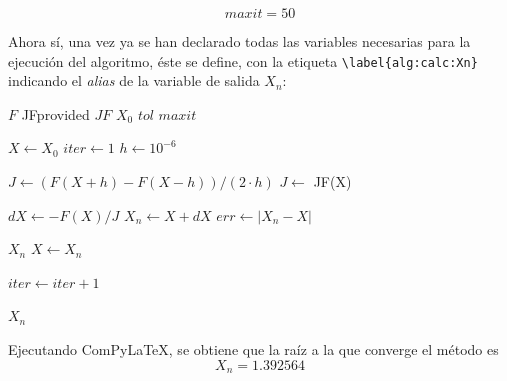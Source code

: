 \documentclass{book}
\begin{document}
\begin{equation}
    maxit = 50
    \label{eq:calc:maxit}
\end{equation}

Ahora sí, una vez ya se han declarado todas las variables necesarias para la ejecución del algoritmo, éste se define, con la etiqueta \verb|\label{alg:calc:Xn}| indicando el \textit{alias} de la variable de salida $X_n$:
\begin{algorithm}[H]
\caption{Pseudocódigo del método de Newton para sistemas no lineales (adaptado de Freire et al.~\cite{freire_newtons_2024}, caso escalar $n=1$)}
\label{alg:calc:Xn}
\begin{algorithmic}[1] %
    \REQUIRE $F$ 
    \REQUIRE JFprovided 
    \REQUIRE $JF$  
    \REQUIRE $X_0$  
    \REQUIRE $tol$  
    \REQUIRE $maxit$  
    
    \STATE $X \gets X_0$
    \STATE $iter \gets 1$
    \STATE $h \gets 10^{-6}$ 
    
            \STATE $J \gets (F(X + h) - F(X - h))/(2 \cdot h)$ 
        \ELSE
            \STATE $J \gets$ JF(X) 
        \ENDIF
        
        \STATE $dX \gets - F(X)/J$ 
        \STATE $X_n \gets X + dX$ 
        \STATE $err \gets |X_n - X|$ 
        
            \RETURN $X_n$ 
        \ELSE
            \STATE $X \gets X_n$
        \ENDIF
        
        \STATE $iter \gets iter + 1$
    \ENDWHILE
    
    \RETURN  $X_n$ 
\end{algorithmic}
\end{algorithm}
Ejecutando ComPyLaTeX, se obtiene que la raíz a la que converge el método es
\begin{equation}
    X_n =
    1.392564
    \label{eq:res:Xn}
\end{equation}
\end{document}
